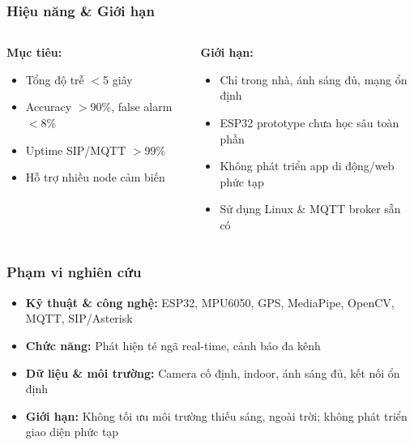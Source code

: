 \begin{frame}
    \frametitle{Hiệu năng \& Giới hạn}
    \begin{columns}[T]
        \begin{column}{0.48\textwidth}
            \textbf{Mục tiêu:}
            \begin{itemize}
                \item Tổng độ trễ $<$5 giây
                \item Accuracy $>$90\%, false alarm $<$8\%
                \item Uptime SIP/MQTT $>$99\%
                \item Hỗ trợ nhiều node cảm biến
            \end{itemize}
        \end{column}
        \begin{column}{0.48\textwidth}
            \textbf{Giới hạn:}
            \begin{itemize}
                \item Chỉ trong nhà, ánh sáng đủ, mạng ổn định
                \item ESP32 prototype chưa học sâu toàn phần
                \item Không phát triển app di động/web phức tạp
                \item Sử dụng Linux \& MQTT broker sẵn có
            \end{itemize}
        \end{column}
    \end{columns}
\end{frame}

\begin{frame}
    \frametitle{Phạm vi nghiên cứu}
    \begin{itemize}
        \item \textbf{Kỹ thuật \& công nghệ:} ESP32, MPU6050, GPS, MediaPipe, OpenCV, MQTT, SIP/Asterisk
        \item \textbf{Chức năng:} Phát hiện té ngã real-time, cảnh báo đa kênh
        \item \textbf{Dữ liệu \& môi trường:} Camera cố định, indoor, ánh sáng đủ, kết nối ổn định
        \item \textbf{Giới hạn:} Không tối ưu môi trường thiếu sáng, ngoài trời; không phát triển giao diện phức tạp
    \end{itemize}
\end{frame}

